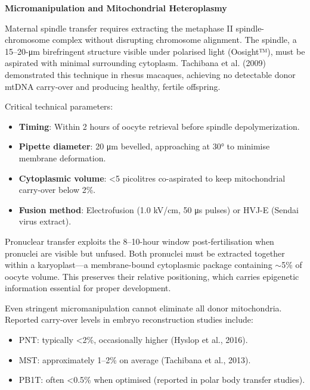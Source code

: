 \begin{technical}
{\Large\textbf{Micromanipulation and Mitochondrial Heteroplasmy}}\\[0.3em]


Maternal spindle transfer requires extracting the metaphase II spindle-chromosome complex without disrupting chromosome alignment. The spindle, a 15–20-μm birefringent structure visible under polarised light (Oosight™), must be aspirated with minimal surrounding cytoplasm. Tachibana et al. (2009) demonstrated this technique in rhesus macaques, achieving no detectable donor mtDNA carry-over and producing healthy, fertile offspring.

Critical technical parameters:
\begin{itemize}[leftmargin=*]
\item \textbf{Timing}: Within 2 hours of oocyte retrieval before spindle depolymerization.
\item \textbf{Pipette diameter}: 20 μm bevelled, approaching at 30° to minimise membrane deformation.
\item \textbf{Cytoplasmic volume}: <5 picolitres co-aspirated to keep mitochondrial carry-over below 2\%.
\item \textbf{Fusion method}: Electrofusion (1.0 kV/cm, 50 μs pulses) or HVJ-E (Sendai virus extract).
\end{itemize}

Pronuclear transfer exploits the 8–10-hour window post-fertilisation when pronuclei are visible but unfused. Both pronuclei must be extracted together within a karyoplast—a membrane-bound cytoplasmic package containing $\sim$5\% of oocyte volume. This preserves their relative positioning, which carries epigenetic information essential for proper development.


Even stringent micromanipulation cannot eliminate all donor mitochondria. Reported carry-over levels in embryo reconstruction studies include:
\begin{itemize}[leftmargin=*]
\item PNT: typically <2\%, occasionally higher (Hyslop et al., 2016).
\item MST: approximately 1–2\% on average (Tachibana et al., 2013).
\item PB1T: often <0.5\% when optimised (reported in polar body transfer studies).
\end{itemize}


\end{technical}
